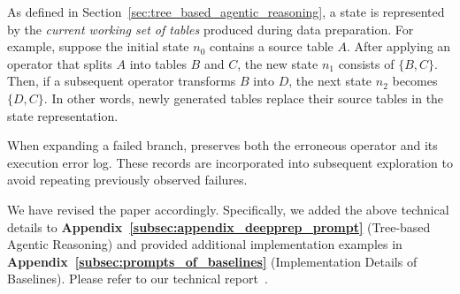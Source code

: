 
As defined in Section~\ref{sec:tree_based_agentic_reasoning}, a state is represented by the \emph{current working set of tables} produced during data preparation. For example, suppose the initial state $n_0$ contains a source table $A$. After applying an operator that splits $A$ into tables $B$ and $C$, the new state $n_1$ consists of $\{B, C\}$. Then, if a subsequent operator transforms $B$ into $D$, the next state $n_2$ becomes $\{D, C\}$. In other words, newly generated tables replace their source tables in the state representation.


When expanding a failed branch, \sys preserves both the erroneous operator and its execution error log. These records are incorporated into subsequent exploration to avoid repeating previously observed failures.

{We have revised the paper accordingly. Specifically, we added the above technical details to \textbf{Appendix~\ref{subsec:appendix_deepprep_prompt}} (Tree-based Agentic Reasoning) and provided additional implementation examples in \textbf{Appendix~\ref{subsec:prompts_of_baselines}} (Implementation Details of Baselines).} Please refer to our technical report~\cite{technical_report}.



